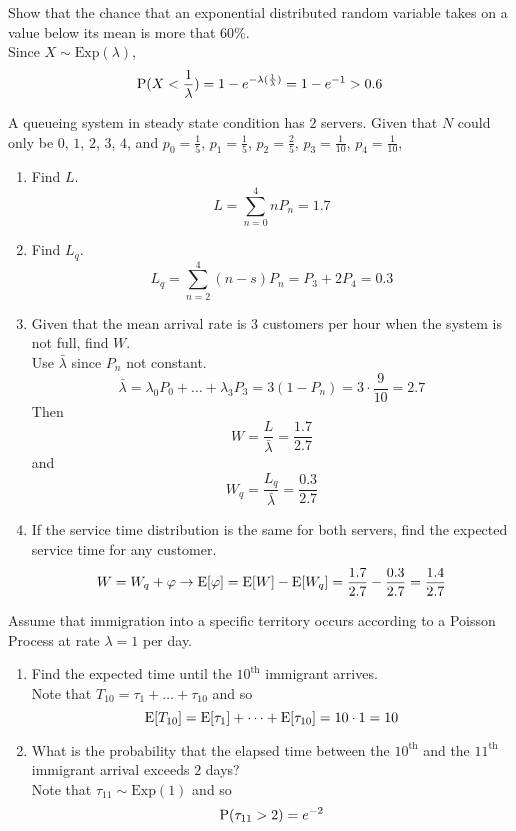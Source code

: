 \documentclass[12pt]{article}
\begin{document}
  \begin{question} Show that the chance that an exponential distributed random variable takes on a value below its mean is more that $60\%$.  \\
  Since $X \sim \text{Exp}(\lambda)$, $$ \mathrm{P}( X < \frac{1}{\lambda} ) = 1 - e^{-\lambda(\frac{1}{\lambda})} = 1 - e^{-1} > 0.6 $$ 
  \end{question} 
  
  \begin{question} A queueing system in steady state condition has $2$ servers. Given that $N$ could only be $0$, $1$, $2$, $3$, $4$, and $p_0 = \frac{1}{5}$, $p_1 = \frac{1}{5}$, $p_2 = \frac{2}{5}$, $p_3 = \frac{1}{10}$, $p_4 = \frac{1}{10}$, \begin{enumerate} 
  \item Find $L$. $$ L = \sum_{n=0}^4 nP_n = 1.7$$ 
  \item Find $L_q$. $$ L_q = \sum_{n=2}^4 (n-s)P_n = P_3 + 2P_4 = 0.3 $$ 
  \item Given that the mean arrival rate is $3$ customers per hour when the system is not full, find $W$. \\ Use $\bar{\lambda}$ since $P_n$ not constant. $$ \bar{\lambda} = \lambda_0P_0 + \dots + \lambda_3P_3 = 3(1 - P_n) = 3 \cdot \frac{9}{10} = 2.7 $$ Then $$ W = \frac{L}{\bar{\lambda}} = \frac{1.7}{2.7} $$ and $$ W_q = \frac{L_q}{\bar{\lambda}} = \frac{0.3}{2.7} $$ 
  \item If the service time distribution is the same for both servers, find the expected service time for any customer. $$ W = W_q + \varphi \to \mathrm{E}[ \varphi ] = \mathrm{E}[ W ] - \mathrm{E}[ W_q ] = \frac{1.7}{2.7} - \frac{0.3}{2.7} = \frac{1.4}{2.7} $$ 
  \end{enumerate} \end{question} 
  
  \begin{question} Assume that immigration into a specific territory occurs according to a Poisson Process at rate $\lambda = 1$ per day. \begin{enumerate} 
  \item Find the expected time until the $10^{\text{th}}$ immigrant arrives. \\
  Note that $T_{10} = \tau_1 + \dots + \tau_{10}$ and so $$ \mathrm{E}[ T_{10} ] = \mathrm{E}[ \tau_1 ] + \dots + \mathrm{E}[ \tau_{10} ] = 10 \cdot 1 = 10 $$ 
  \item What is the probability that the elapsed time between the $10^{\text{th}}$ and the $11^{\text{th}}$ immigrant arrival exceeds $2$ days? \\
  Note that $\tau_{11} \sim \text{Exp}(1)$ and so $$ \mathrm{P}( \tau_{11} > 2 ) = e^{-2} $$ 
  \end{enumerate} \end{question} 
 
\end{document}

